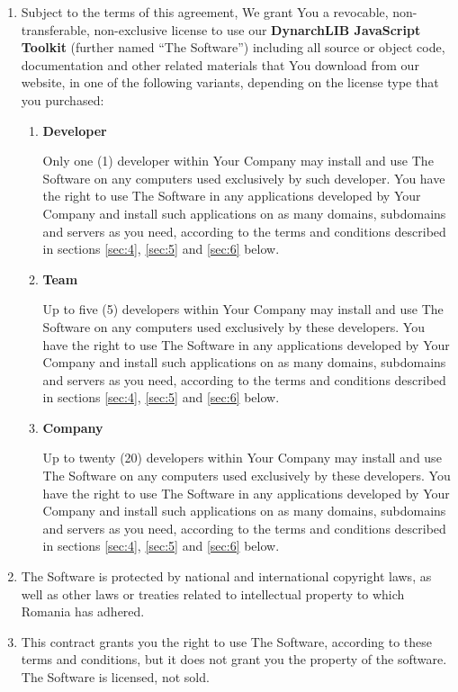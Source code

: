 \documentclass[a4paper,10pt]{article}
\begin{document}
\begin{enumerate}

  \item Subject to the terms of this agreement, We grant You a revocable,
    non-transferable, non-exclusive license to use our \textbf{DynarchLIB
      JavaScript Toolkit} (further named “The Software”) including all source
    or object code, documentation and other related materials that You download
    from our website, in one of the following variants, depending on the
    license type that you purchased:

    \begin{enumerate}

      \item \textbf{Developer}

        Only one (1) developer within Your Company may install and use The
        Software on any computers used exclusively by such developer.  You have
        the right to use The Software in any applications developed by Your
        Company and install such applications on as many domains, subdomains
        and servers as you need, according to the terms and conditions
        described in sections \ref{sec:4}, \ref{sec:5} and \ref{sec:6} below.

      \item \textbf{Team}

        Up to five (5) developers within Your Company may install and use The
        Software on any computers used exclusively by these developers.  You
        have the right to use The Software in any applications developed by
        Your Company and install such applications on as many domains,
        subdomains and servers as you need, according to the terms and
        conditions described in sections \ref{sec:4}, \ref{sec:5} and
        \ref{sec:6} below.

      \item \textbf{Company}

        Up to twenty (20) developers within Your Company may install and use
        The Software on any computers used exclusively by these developers.
        You have the right to use The Software in any applications developed by
        Your Company and install such applications on as many domains,
        subdomains and servers as you need, according to the terms and
        conditions described in sections \ref{sec:4}, \ref{sec:5} and
        \ref{sec:6} below.

    \end{enumerate}

  \item The Software is protected by national and international copyright laws,
    as well as other laws or treaties related to intellectual property to which
    Romania has adhered.

  \item This contract grants you the right to use The Software, according to
    these terms and conditions, but it does not grant you the property of the
    software.  The Software is licensed, not sold.

\end{enumerate}
\end{document}
